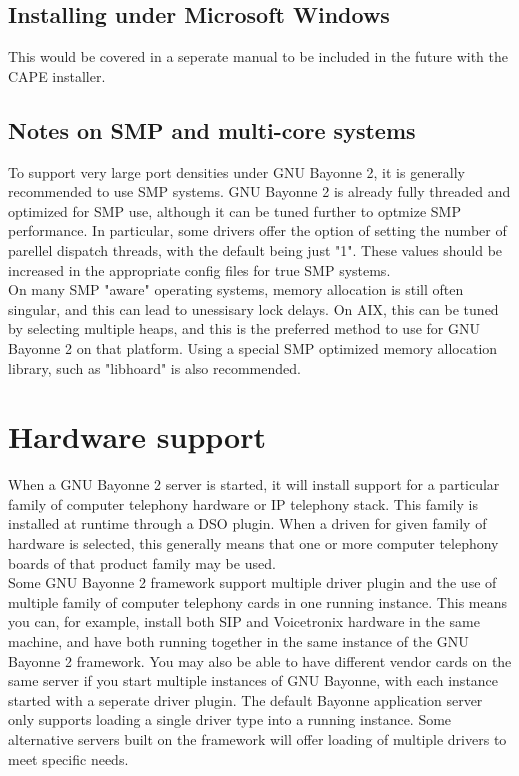 \documentclass[a4paper,12pt]{article}
\begin{document}
\subsection{Installing under Microsoft Windows}

This would be covered in a seperate manual to be included in the future
with the CAPE installer. \\

\subsection{Notes on SMP and multi-core systems}

To support very large port densities under GNU Bayonne 2, it is generally
recommended to use SMP systems.  GNU Bayonne 2 is already fully threaded
and optimized for SMP use, although it can be tuned further to optmize
SMP performance.  In particular, some drivers offer the option of      
setting the number of parellel dispatch threads, with the default being
just "1".  These values should be increased in the appropriate config  
files for true SMP systems. \\

On many SMP "aware" operating systems, memory allocation is still often
singular, and this can lead to unessisary lock delays.  On AIX, this can
be tuned by selecting multiple heaps, and this is the preferred method
to use for GNU Bayonne 2 on that platform.  Using a special SMP
optimized memory allocation library, such as "libhoard" is also
recommended. \\

\section{Hardware support}       

When a GNU Bayonne 2 server is started, it will install support for a
particular family of computer telephony hardware or IP telephony stack. 
This family is installed at runtime through a DSO plugin.  When a driven
for given family of hardware is selected, this generally means that one
or more computer telephony boards of that product family may be used. \\

Some GNU Bayonne 2 framework support multiple driver plugin and the use
of multiple family of computer telephony cards in one running instance. 
This means you can, for example, install both SIP and Voicetronix
hardware in the same machine, and have both running together in the same
instance of the GNU Bayonne 2 framework.  You may also be able to have
different vendor cards on the same server if you start multiple
instances of GNU Bayonne, with each instance started with a seperate
driver plugin.  The default Bayonne application server only supports
loading a single driver type into a running instance.  Some alternative
servers built on the framework will offer loading of multiple drivers to
meet specific needs. \\
\end{document}
